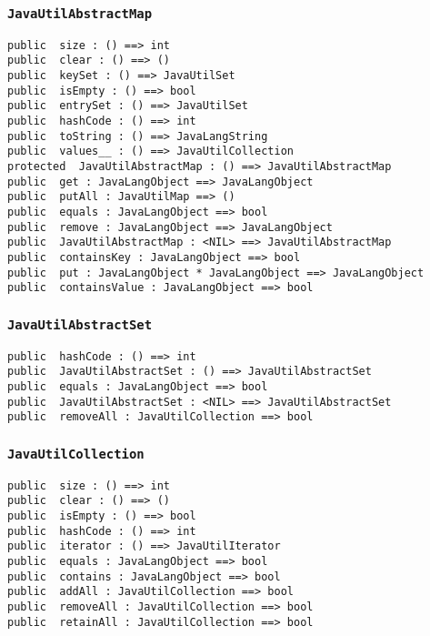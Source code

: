 \documentclass[\pformat,12pt]{article}
\begin{document}
\subsubsection{\texttt{JavaUtilAbstractMap}}
\begin{small}
\begin{verbatim}
public  size : () ==> int
public  clear : () ==> ()
public  keySet : () ==> JavaUtilSet
public  isEmpty : () ==> bool
public  entrySet : () ==> JavaUtilSet
public  hashCode : () ==> int
public  toString : () ==> JavaLangString
public  values__ : () ==> JavaUtilCollection
protected  JavaUtilAbstractMap : () ==> JavaUtilAbstractMap
public  get : JavaLangObject ==> JavaLangObject
public  putAll : JavaUtilMap ==> ()
public  equals : JavaLangObject ==> bool
public  remove : JavaLangObject ==> JavaLangObject
public  JavaUtilAbstractMap : <NIL> ==> JavaUtilAbstractMap
public  containsKey : JavaLangObject ==> bool
public  put : JavaLangObject * JavaLangObject ==> JavaLangObject
public  containsValue : JavaLangObject ==> bool
\end{verbatim}
\end{small}

\subsubsection{\texttt{JavaUtilAbstractSet}}
\begin{small}
\begin{verbatim}
public  hashCode : () ==> int
public  JavaUtilAbstractSet : () ==> JavaUtilAbstractSet
public  equals : JavaLangObject ==> bool
public  JavaUtilAbstractSet : <NIL> ==> JavaUtilAbstractSet
public  removeAll : JavaUtilCollection ==> bool
\end{verbatim}
\end{small}

\subsubsection{\texttt{JavaUtilCollection}}
\begin{small}
\begin{verbatim}
public  size : () ==> int
public  clear : () ==> ()
public  isEmpty : () ==> bool
public  hashCode : () ==> int
public  iterator : () ==> JavaUtilIterator
public  equals : JavaLangObject ==> bool
public  contains : JavaLangObject ==> bool
public  addAll : JavaUtilCollection ==> bool
public  removeAll : JavaUtilCollection ==> bool
public  retainAll : JavaUtilCollection ==> bool
\end{verbatim}
\end{small}
\end{document}
